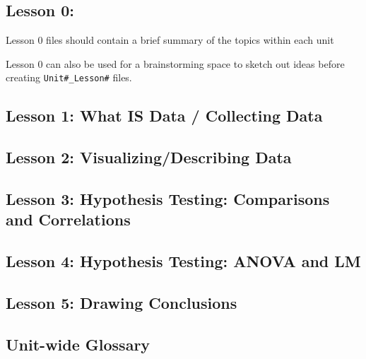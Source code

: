 \documentclass[
]{book}
\begin{document}
\hypertarget{lesson-0}{%
\subsection{Lesson 0:}\label{lesson-0}}

Lesson 0 files should contain a brief summary of the topics within each unit

Lesson 0 can also be used for a brainstorming space to sketch out ideas before creating \texttt{Unit\#\_Lesson\#} files.

\hypertarget{lesson-1-what-is-data-collecting-data}{%
\subsection*{Lesson 1: What IS Data / Collecting Data}\label{lesson-1-what-is-data-collecting-data}}

\hypertarget{lesson-2-visualizingdescribing-data}{%
\subsection*{Lesson 2: Visualizing/Describing Data}\label{lesson-2-visualizingdescribing-data}}

\hypertarget{lesson-3-hypothesis-testing-comparisons-and-correlations}{%
\subsection*{Lesson 3: Hypothesis Testing: Comparisons and Correlations}\label{lesson-3-hypothesis-testing-comparisons-and-correlations}}

\hypertarget{lesson-4-hypothesis-testing-anova-and-lm}{%
\subsection*{Lesson 4: Hypothesis Testing: ANOVA and LM}\label{lesson-4-hypothesis-testing-anova-and-lm}}

\hypertarget{lesson-5-drawing-conclusions}{%
\subsection*{Lesson 5: Drawing Conclusions}\label{lesson-5-drawing-conclusions}}

\hypertarget{unit-wide-glossary}{%
\subsection*{Unit-wide Glossary}\label{unit-wide-glossary}}
\end{document}
